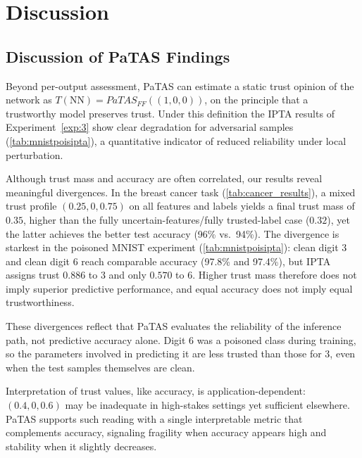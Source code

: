 \vspace{-0.5em}
\section{Discussion}\label{sec:discussion}
\vspace{-0.2em}
\subsection{Discussion of PaTAS Findings}

Beyond per-output assessment, PaTAS can estimate a static trust opinion of the network as \(T(\text{NN}) = PaTAS_{FF}((1,0,0))\), on the principle that a trustworthy model preserves trust. Under this definition the IPTA results of Experiment~\ref{exp:3} show clear degradation for adversarial samples (\cref{tab:mnistpoisipta}), a quantitative indicator of reduced reliability under local perturbation.

Although trust mass and accuracy are often correlated, our results reveal meaningful divergences. In the breast cancer task (\cref{tab:cancer_results}), a mixed trust profile \((0.25,0,0.75)\) on all features and labels yields a final trust mass of \(0.35\), higher than the fully uncertain-features/fully trusted-label case (\(0.32\)), yet the latter achieves the better test accuracy (96\% vs.\ 94\%). The divergence is starkest in the poisoned MNIST experiment (\cref{tab:mnistpoisipta}): clean digit \(3\) and clean digit \(6\) reach comparable accuracy (97.8\% and 97.4\%), but IPTA assigns trust \(0.886\) to \(3\) and only \(0.570\) to \(6\). Higher trust mass therefore does not imply superior predictive performance, and equal accuracy does not imply equal trustworthiness.

These divergences reflect that PaTAS evaluates the reliability of the inference path, not predictive accuracy alone. Digit \(6\) was a poisoned class during training, so the parameters involved in predicting it are less trusted than those for \(3\), even when the test samples themselves are clean. 

Interpretation of trust values, like accuracy, is application-dependent: \((0.4,0,0.6)\) may be inadequate in high-stakes settings yet sufficient elsewhere. PaTAS supports such reading with a single interpretable metric that complements accuracy, signaling fragility when accuracy appears high and stability when it slightly decreases.

